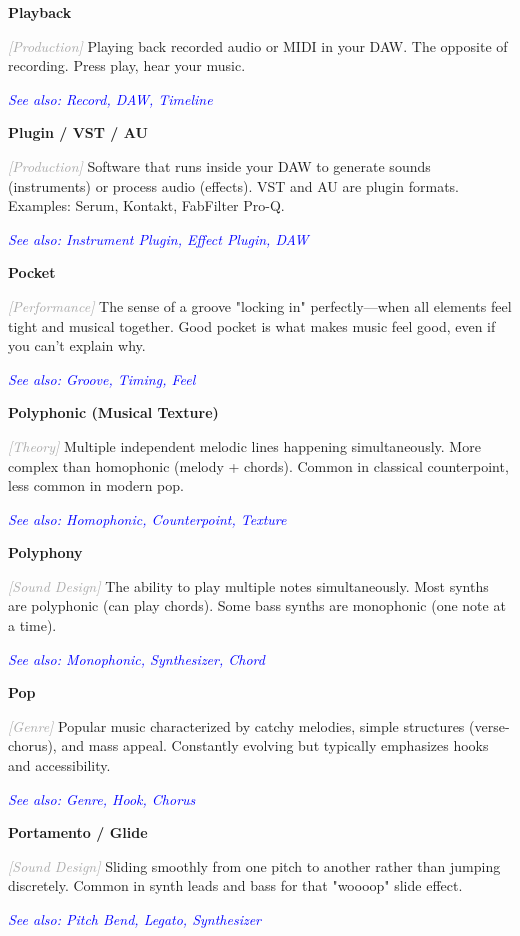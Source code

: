 \documentclass[11pt,letterpaper]{article}
\newcommand{\term}[1]{\textbf{\large\color{purple}#1}}
\newcommand{\category}[1]{\textcolor{darkgray}{\textit{\small [#1]}}}
\newcommand{\seealso}[1]{\textcolor{blue}{\textit{See also: #1}}}
\newenvironment{termdef}[1]
  {\noindent\term{#1}\par\nopagebreak}
  {\par\vspace{0.3em}}
\begin{document}
\begin{termdef}{Playback}
\category{Production}
Playing back recorded audio or MIDI in your DAW. The opposite of recording. Press play, hear your music.

\seealso{Record, DAW, Timeline}
\end{termdef}

\begin{termdef}{Plugin / VST / AU}
\category{Production}
Software that runs inside your DAW to generate sounds (instruments) or process audio (effects). VST and AU are plugin formats. Examples: Serum, Kontakt, FabFilter Pro-Q.

\seealso{Instrument Plugin, Effect Plugin, DAW}
\end{termdef}

\begin{termdef}{Pocket}
\category{Performance}
The sense of a groove "locking in" perfectly—when all elements feel tight and musical together. Good pocket is what makes music feel good, even if you can't explain why.

\seealso{Groove, Timing, Feel}
\end{termdef}

\begin{termdef}{Polyphonic (Musical Texture)}
\category{Theory}
Multiple independent melodic lines happening simultaneously. More complex than homophonic (melody + chords). Common in classical counterpoint, less common in modern pop.

\seealso{Homophonic, Counterpoint, Texture}
\end{termdef}

\begin{termdef}{Polyphony}
\category{Sound Design}
The ability to play multiple notes simultaneously. Most synths are polyphonic (can play chords). Some bass synths are monophonic (one note at a time).

\seealso{Monophonic, Synthesizer, Chord}
\end{termdef}

\begin{termdef}{Pop}
\category{Genre}
Popular music characterized by catchy melodies, simple structures (verse-chorus), and mass appeal. Constantly evolving but typically emphasizes hooks and accessibility.

\seealso{Genre, Hook, Chorus}
\end{termdef}

\begin{termdef}{Portamento / Glide}
\category{Sound Design}
Sliding smoothly from one pitch to another rather than jumping discretely. Common in synth leads and bass for that "woooop" slide effect.

\seealso{Pitch Bend, Legato, Synthesizer}
\end{termdef}
\end{document}
